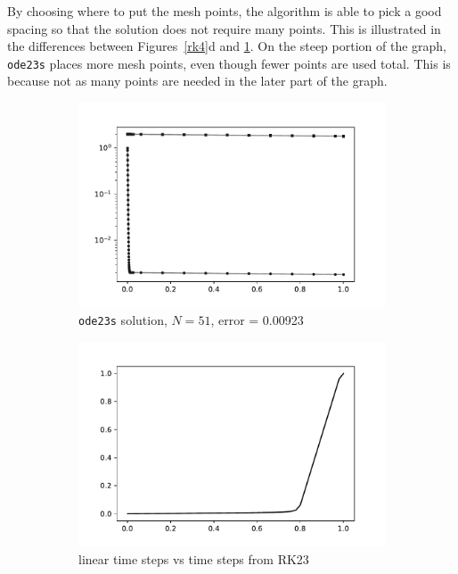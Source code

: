 \documentclass[10pt]{article}
\begin{document}
\begin{solution}[Solution]
\begin{enumerate}[label=(\alph*)]
    By choosing where to put the mesh points, the algorithm is able to pick a good spacing so that the solution does not require many points. This is illustrated in the differences between Figures~\ref{rk4}d and \ref{rk23}. On the steep portion of the graph, {\tt ode23s} places more mesh points, even though fewer points are used total. This is because not as many points are needed in the later part of the graph.
    \begin{figure}[H]\centering
        \begin{subfigure}{.48\textwidth}\centering
            \includegraphics[width=\textwidth]{img/5/ode23s.pdf}
            \caption{{\tt ode23s} solution,  \( N=51 \), error = 0.00923}
            \label{rk23}
        \end{subfigure}
        \begin{subfigure}{.48\textwidth}\centering
            \includegraphics[width=\textwidth]{img/5/ode23s_t.pdf}
            \caption{linear time steps vs time steps from RK23}
            \label{rk23t}
        \end{subfigure}
    \caption{}
    \end{figure}


\end{enumerate}

\end{solution}
\end{document}
